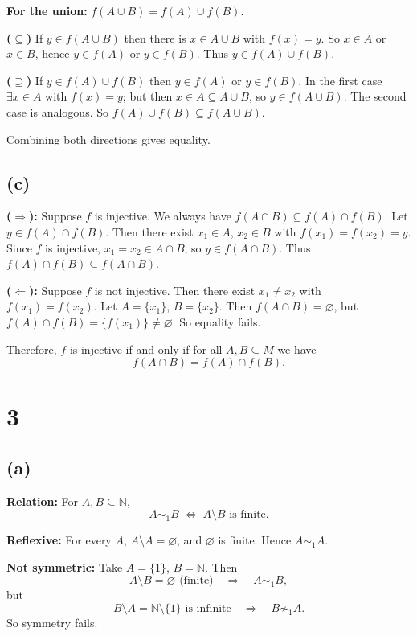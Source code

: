 \documentclass[12pt,a4paper]{article}
\theoremstyle{definition}
\theoremstyle{remark}
\begin{document}
\textbf{For the union:} $f(A\cup B)=f(A)\cup f(B)$.

\textbf{($\subseteq$)} If $y\in f(A\cup B)$ then there is $x\in A\cup B$ with $f(x)=y$. So $x\in A$ or $x\in B$, hence $y\in f(A)$ or $y\in f(B)$. Thus $y\in f(A)\cup f(B)$.

\textbf{($\supseteq$)} If $y\in f(A)\cup f(B)$ then $y\in f(A)$ or $y\in f(B)$. In the first case $\exists x\in A$ with $f(x)=y$; but then $x\in A\subseteq A\cup B$, so $y\in f(A\cup B)$. The second case is analogous. So $f(A)\cup f(B)\subseteq f(A\cup B)$.

Combining both directions gives equality.

\subsection*{(c)}

\textbf{($\Rightarrow$):} Suppose $f$ is injective. We always have $f(A \cap B) \subseteq f(A) \cap f(B)$. Let $y \in f(A) \cap f(B)$. Then there exist $x_1 \in A$, $x_2 \in B$ with $f(x_1)=f(x_2)=y$. Since $f$ is injective, $x_1 = x_2 \in A \cap B$, so $y \in f(A \cap B)$. Thus $f(A) \cap f(B) \subseteq f(A \cap B)$.

\textbf{($\Leftarrow$):} Suppose $f$ is not injective. Then there exist $x_1 \neq x_2$ with $f(x_1)=f(x_2)$. Let $A=\{x_1\}$, $B=\{x_2\}$. Then $f(A \cap B)=\varnothing$, but $f(A)\cap f(B)=\{f(x_1)\} \neq \varnothing$. So equality fails.

Therefore, $f$ is injective if and only if for all $A,B \subseteq M$ we have
\[
f(A \cap B) = f(A) \cap f(B).
\]



\section*{3}

\subsection*{(a)}

\textbf{Relation:} For $A,B \subseteq \mathbb{N}$,
\[
A \sim_1 B \;\Longleftrightarrow\; A \setminus B \text{ is finite}.
\]

\textbf{Reflexive:} For every $A$, $A \setminus A = \varnothing$, and $\varnothing$ is finite. Hence $A \sim_1 A$.

\textbf{Not symmetric:} Take $A = \{1\}$, $B = \mathbb{N}$. Then
\[
A \setminus B = \varnothing \text{ (finite)} \quad\Rightarrow\quad A \sim_1 B,
\]
but
\[
B \setminus A = \mathbb{N} \setminus \{1\} \text{ is infinite} \quad\Rightarrow\quad B \not\sim_1 A.
\]
So symmetry fails.
\end{document}
